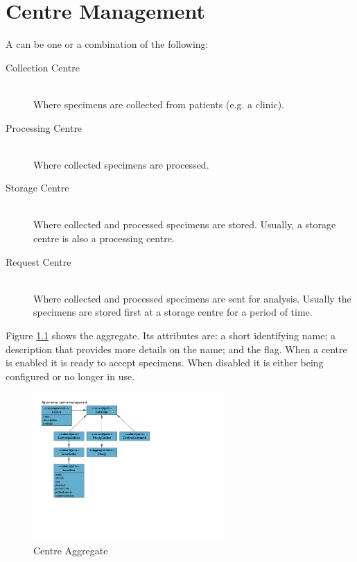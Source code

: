 \chapter{Centre Management}
\label{chap:centre-management}

A  can be one or a combination of the following:
\begin{description}

\item[Collection Centre] \hfill \\ Where specimens are collected from patients
  (e.g. a clinic).

\item[Processing Centre] \hfill \\ Where collected specimens are processed.

\item[Storage Centre] \hfill \\ Where collected and processed specimens are
  stored. Usually, a storage centre is also a processing centre.

\item[Request Centre] \hfill \\ Where collected and processed specimens are
  sent for analysis. Usually the specimens are stored first at a storage
  centre for a period of time.
\end{description}

Figure \ref{fig:centre-aggregate} shows the  aggregate. Its
attributes are: a short identifying name; a description that provides more
details on the name; and the  flag. When a centre is enabled
it is ready to accept specimens. When disabled it is either being configured or
no longer in use.

\begin{figure}[H]
  \centering
  \includegraphics[trim={10mm 62mm 108mm 18mm}, clip,
    width=0.65\textwidth]{images/centre-management}
  \caption{Centre Aggregate}
  \label{fig:centre-aggregate}
\end{figure}

